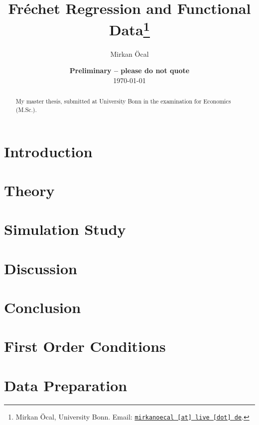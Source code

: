 \documentclass[12pt, a4paper, bibtotoc, liststotoc]{scrartcl}
\begin{document}
\title{Fréchet Regression and Functional Data\thanks{Mirkan Öcal, University Bonn. Email: \href{mailto:mirkanoecal@live.de}{\nolinkurl{mirkanoecal [at] live [dot] de}}.}}

\author{Mirkan Öcal}

\date{
    {\bf Preliminary -- please do not quote}
    \\[1ex]
    \today
}

\maketitle
\thispagestyle{empty}

\begin{abstract}
    My master thesis, submitted at University Bonn in the examination for Economics
    (M.Sc.).
\end{abstract}

\clearpage

\newpage %
\tableofcontents	%
\listoftables		%
\listoffigures		%

\newpage %

\section{Introduction}
\label{sec:introduction}


\section{Theory}
\label{sec:theory}

\section{Simulation Study}
\label{sec:simulation study}

\section{Discussion}
\label{sec:discussion}

\section{Conclusion}
\label{sec:conclusion}





\newpage
\appendix
{}

\section{First Order Conditions}
\label{sec:first order conditions}

\section{Data Preparation}
\label{sec:data preparation}



\newpage

\nocite{von_gaudecker_templates_2019}
\printbibliography
\end{document}
